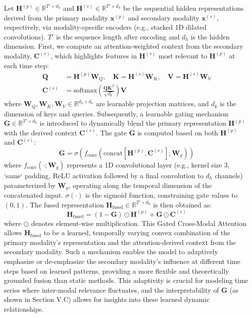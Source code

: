 \documentclass[journal]{IEEEtran}
\begin{document}
Let $\mathbf{H}^{(p)} \in \mathbb{R}^{T' \times d_h}$ and $\mathbf{H}^{(s)} \in \mathbb{R}^{T' \times d_h}$ be the sequential hidden representations derived from the primary modality $\mathbf{x}^{(p)}$ and secondary modality $\mathbf{x}^{(s)}$, respectively, via modality-specific encoders (e.g., stacked 1D dilated convolutions). $T'$ is the sequence length after encoding and $d_h$ is the hidden dimension. First, we compute an attention-weighted context from the secondary modality, $\mathbf{C}^{(s)}$, which highlights features in $\mathbf{H}^{(s)}$ most relevant to $\mathbf{H}^{(p)}$ at each time step:
\begin{align}
\mathbf{Q} &= \mathbf{H}^{(p)} \mathbf{W}_Q, \quad \mathbf{K} = \mathbf{H}^{(s)} \mathbf{W}_K, \quad \mathbf{V} = \mathbf{H}^{(s)} \mathbf{W}_V \label{eq:qkv_matrices}\\
\mathbf{C}^{(s)} &= \text{softmax}\left(\frac{\mathbf{Q}\mathbf{K}^T}{\sqrt{d_k}}\right)\mathbf{V} \label{eq:attention_context}
\end{align}
where $\mathbf{W}_Q, \mathbf{W}_K, \mathbf{W}_V \in \mathbb{R}^{d_h \times d_k}$ are learnable projection matrices, and $d_k$ is the dimension of keys and queries.
Subsequently, a learnable gating mechanism $\mathbf{G} \in \mathbb{R}^{T' \times d_h}$ is introduced to dynamically blend the primary representation $\mathbf{H}^{(p)}$ with the derived context $\mathbf{C}^{(s)}$. The gate $\mathbf{G}$ is computed based on both $\mathbf{H}^{(p)}$ and $\mathbf{C}^{(s)}$:
\begin{equation}
\mathbf{G} = \sigma(f_{\text{conv}}(\text{concat}[\mathbf{H}^{(p)}, \mathbf{C}^{(s)}]; \mathbf{W}_g)) \label{eq:gate_revised}
\end{equation}
where $f_{\text{conv}}(\cdot; \mathbf{W}_g)$ represents a 1D convolutional layer (e.g., kernel size 3, `same` padding, ReLU activation followed by a final convolution to $d_h$ channels) parameterized by $\mathbf{W}_g$, operating along the temporal dimension of the concatenated input. $\sigma(\cdot)$ is the sigmoid function, constraining gate values to $(0,1)$. The fused representation $\mathbf{H}_{\text{fused}} \in \mathbb{R}^{T' \times d_h}$ is then obtained as:
\begin{equation}
\mathbf{H}_{\text{fused}} = (1 - \mathbf{G}) \odot \mathbf{H}^{(p)} + \mathbf{G} \odot \mathbf{C}^{(s)} \label{eq:gated_fusion_revised}
\end{equation}
where $\odot$ denotes element-wise multiplication. This Gated Cross-Modal Attention allows $\mathbf{H}_{\text{fused}}$ to be a learned, temporally varying convex combination of the primary modality's representation and the attention-derived context from the secondary modality. Such a mechanism enables the model to adaptively emphasize or de-emphasize the secondary modality's influence at different time steps based on learned patterns, providing a more flexible and theoretically grounded fusion than static methods. This adaptivity is crucial for modeling time series where inter-modal relevance fluctuates, and the interpretability of $\mathbf{G}$ (as shown in Section V.C) allows for insights into these learned dynamic relationships.
\end{document}
